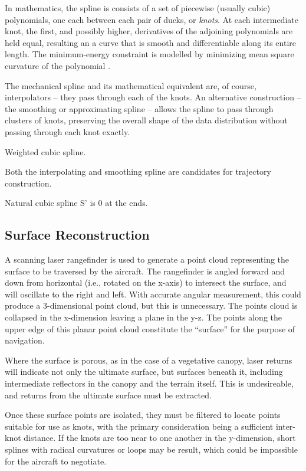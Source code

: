 \documentclass[doc]{apa6}
\begin{document}
In mathematics, the spline is consists of a set of piecewise (usually cubic) polynomials, one each between each pair of ducks, or \emph{knots}. At each intermediate knot, the first, and possibly higher, derivatives of the adjoining polynomials are held equal, resulting an a curve that is smooth and differentiable along its entire length. The minimum-energy constraint is modelled by minimizing mean square curvature of the polynomial \parencite{Wegman2016}.

The mechanical spline and its mathematical equivalent are, of course, interpolators -- they pass through each of the knots. An alternative construction -- the smoothing or approximating spline -- allows the spline to pass through clusters of knots, preserving the overall shape of the data distribution without passing through each knot exactly. 

Weighted cubic spline.

Both the interpolating and smoothing spline are candidates for trajectory construction.

Natural cubic spline S' is 0 at the ends.


\subsection{Surface Reconstruction}

A scanning laser rangefinder is used to generate a point cloud representing the surface to be traversed by the aircraft. The rangefinder is angled forward and down from horizontal (i.e., rotated on the x-axis) to intersect the surface, and will oscillate to the right and left. With accurate angular measurement, this could produce a 3-dimensional point cloud, but this is unnecessary. The points cloud is collapsed in the x-dimension leaving a plane in the y-z. The points along the upper edge of this planar point cloud constitute the ``surface'' for the purpose of navigation.

Where the surface is porous, as in the case of a vegetative canopy, laser returns will indicate not only the ultimate surface, but surfaces beneath it, including intermediate reflectors in the canopy and the terrain itself. This is undesireable, and returns from the ultimate surface must be extracted. 

Once these surface points are isolated, they must be filtered to locate points suitable for use as knots, with the primary consideration being a sufficient inter-knot distance. If the knots are too near to one another in the y-dimension, short splines with radical curvatures or loops may be result, which could be impossible for the aircraft to negotiate.
\end{document}
